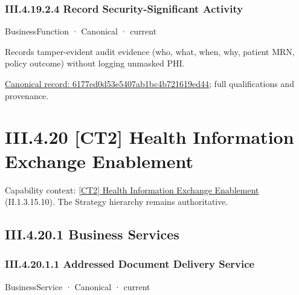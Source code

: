 \subsubsection*{III.4.19.2.4 Record Security-Significant Activity}
\label{navigation:III.4.19.2.4}

\label{element:6177ed0d53e5407ab1bc4b721619ed44}
{\small BusinessFunction · Canonical · current}\par

Records tamper-evident audit evidence (who, what, when, why, patient MRN, policy outcome) without logging unmasked PHI.


{\footnotesize \href{../../../../continuum/business/business-function/6177ed0d53e5407ab1bc4b721619ed44.md}{Canonical record: 6177ed0d53e5407ab1bc4b721619ed44}; full qualifications and provenance.}\par
\section*{III.4.20 [CT2] Health Information Exchange Enablement}
\label{navigation:III.4.20}

{\small Capability context: \hyperref[element:a61a15908ed544e6acf3e9cab63a0267]{[CT2] Health Information Exchange Enablement} (II.1.3.15.10). The Strategy hierarchy remains authoritative.}\par
\subsection*{III.4.20.1 Business Services}
\label{navigation:III.4.20.1}

\subsubsection*{III.4.20.1.1 Addressed Document Delivery Service}
\label{navigation:III.4.20.1.1}

\label{element:97080460bacf40ef8b6db2091cc3bb6e}
{\small BusinessService · Canonical · current}\par

